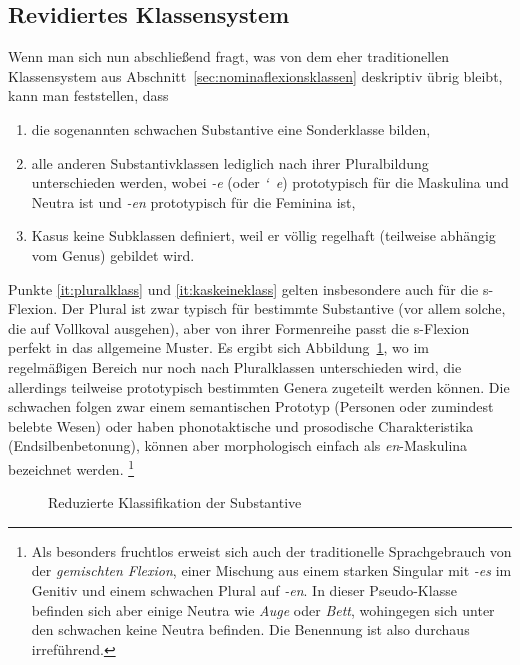 \subsection{Revidiertes Klassensystem}

\label{sec:neuenklassen}


Wenn man sich nun abschließend fragt, was von dem eher traditionellen Klassensystem aus Abschnitt~\ref{sec:nominaflexionsklassen} deskriptiv übrig bleibt, kann man feststellen, dass

\begin{enumerate}\Lf
  \item die sogenannten schwachen Substantive eine Sonderklasse bilden,
  \item\label{it:pluralklass} alle anderen Substantivklassen lediglich nach ihrer Pluralbildung unterschieden werden, wobei \textit{-e} (oder \textit{\char`~e}) prototypisch für die Maskulina und Neutra ist und \textit{-en} prototypisch für die Feminina ist,
  \item\label{it:kaskeineklass} Kasus keine Subklassen definiert, weil er völlig regelhaft (teilweise abhängig vom Genus) gebildet wird.
\end{enumerate}

Punkte \ref{it:pluralklass} und \ref{it:kaskeineklass} gelten insbesondere auch für die s-Flexion.
Der Plural ist zwar typisch für bestimmte Substantive (vor allem solche, die auf Vollkoval ausgehen), aber von ihrer Formenreihe passt die s-Flexion perfekt in das allgemeine Muster.
Es ergibt sich Abbildung~\ref{fig:neuenklassen}, wo im regelmäßigen Bereich nur noch nach Pluralklassen unterschieden wird, die allerdings teilweise prototypisch bestimmten Genera zugeteilt werden können.
Die schwachen folgen zwar einem semantischen Prototyp (Personen oder zumindest belebte Wesen) oder haben phonotaktische und prosodische Charakteristika (\zB Endsilbenbetonung), können aber morphologisch einfach als \textit{en}-Maskulina bezeichnet werden.%
\footnote{Als besonders fruchtlos erweist sich auch der traditionelle Sprachgebrauch von der \textit{gemischten Flexion}, einer Mischung aus einem starken Singular mit \textit{-es} im Genitiv und einem schwachen Plural auf \textit{-en}.
In dieser Pseudo-Klasse befinden sich aber einige Neutra wie \textit{Auge} oder \textit{Bett}, wohingegen sich unter den schwachen keine Neutra befinden.
Die Benennung ist also durchaus irreführend.}

\begin{figure}[!htbp]
  \centering
  \caption{Reduzierte Klassifikation der Substantive}
  \label{fig:neuenklassen}
\end{figure}

